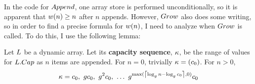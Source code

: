 In the code for $Append$, one array store is performed unconditionally, so it is apparent that $w(n) \geq n$ after $n$ appends. However, $Grow$ also does some writing, so in order to find a precise formula for $w(n)$, I need to analyze when $Grow$ is called. To do this, I use the following lemma:

\begin{lemma}
\label{lem:CapacitySeq}
	Let $L$ be a dynamic array. Let its \textbf{capacity sequence}, $\kappa$, be the range of values for $L.Cap$ as $n$ items are appended. For $n = 0$, trivially $\kappa = (c_0)$. For $n > 0$,
	\begin{align*}
	\VarCapacitySeq = \VarInitCapacity,\ \VarGrowthFactor\VarInitCapacity,\ \VarGrowthFactor^2\VarInitCapacity,\ \ldots\ \VarGrowthFactor^{\max(\ExprMessy, 0)}\VarInitCapacity
	\end{align*}
\end{lemma}

